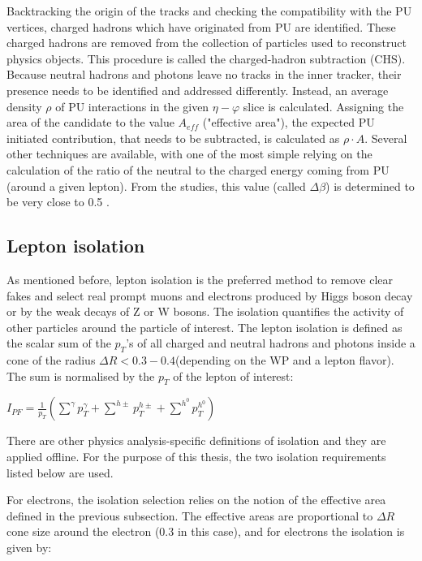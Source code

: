 Backtracking the origin of the tracks and checking the compatibility with the PU vertices, charged hadrons which have originated from PU are identified. These charged hadrons are removed from the collection of particles used to reconstruct physics objects. This procedure is called the charged-hadron subtraction (CHS). Because neutral hadrons and photons leave no tracks in the inner tracker, their presence needs to be identified and addressed differently. Instead, an average density $\rho$ of PU interactions in the given $\eta - \varphi$ slice is calculated. Assigning the area of the candidate to the value $A_{eff}$ ("effective area"), the expected PU initiated contribution, that needs to be subtracted, is calculated as $\rho \cdot A$. Several other techniques are available, with one of the most simple relying on the calculation of the ratio of the neutral to the charged energy coming from PU (around a given lepton). From the studies, this value (called $\Delta \beta$) is determined to be very close to 0.5 \cite{PU_mitigation}. 

\subsection{Lepton isolation}\label{sec:isolation}

As mentioned before, lepton isolation is the preferred method to remove clear fakes and select real  prompt  muons  and  electrons  produced  by Higgs boson decay or by the weak decays of Z or W bosons. The isolation quantifies the activity of other particles around the particle of interest. The lepton isolation is defined as the scalar sum of the $p_T$'s of all charged and neutral hadrons and photons inside a cone of the radius $\Delta R <  0.3 - 0.4 $(depending on the WP and a lepton flavor). The sum is normalised by the $p_T$ of the lepton of interest:

$I_{PF} = \frac{1}{p_T} (\sum^\gamma p^\gamma_T + \sum^{h \pm} p^{h \pm}_T + \sum^{h^0} p^{h^0 }_T)$

There are other physics analysis-specific definitions of isolation and they are applied offline. For the purpose of this thesis, the two isolation requirements listed below are used.

For electrons, the isolation selection relies on the notion of the effective area defined in the previous subsection. The effective areas are proportional to $\Delta R$ cone size around the electron (0.3 in this case), and for electrons the isolation is given by: 

